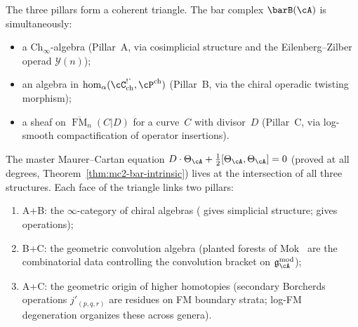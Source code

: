 \begin{remark}
\label{rem:three-pillar-triangle}
The three pillars form a coherent triangle. The bar complex
$\barB(\cA)$ is simultaneously:
\begin{itemize}
\item a $\mathrm{Ch}_\infty$-algebra (Pillar~A, via cosimplicial structure
 and the Eilenberg--Zilber operad $\mathcal{Y}(n)$);
\item an algebra in
 $\operatorname{hom}_\alpha(\cC^{\textup{!\textasciigrave}}_{\mathrm{ch}},
 \cP^{\mathrm{ch}})$ (Pillar~B, via the chiral operadic twisting
 morphism);
\item a sheaf on $\overline{\operatorname{FM}}_n(C|D)$ for a curve~$C$
 with divisor~$D$ (Pillar~C, via log-smooth compactification of
 operator insertions).
\end{itemize}
The master Maurer--Cartan equation
$D \cdot \Theta_\cA + \tfrac{1}{2}[\Theta_\cA, \Theta_\cA] = 0$
(proved at all degrees, Theorem~\ref{thm:mc2-bar-intrinsic})
lives at the intersection of all three structures. Each face of the
triangle links two pillars:
\begin{enumerate}[label=\textup{(\roman*)}]
\item A+B: the $\infty$-category of chiral algebras
 (\cite[Theorem~3.8]{Val16} gives simplicial structure; \cite{MS24}
 gives operations);
\item B+C: the geometric convolution algebra (planted forests of
 Mok~\cite{Mok25} are the combinatorial data controlling the
 convolution bracket on $\mathfrak{g}_\cA^{\mathrm{mod}}$);
\item A+C: the geometric origin of higher homotopies (secondary Borcherds
 operations $j'_{(p,q,r)}$ are residues on FM boundary strata; log-FM
 degeneration organizes these across genera).
\end{enumerate}
\end{remark}

